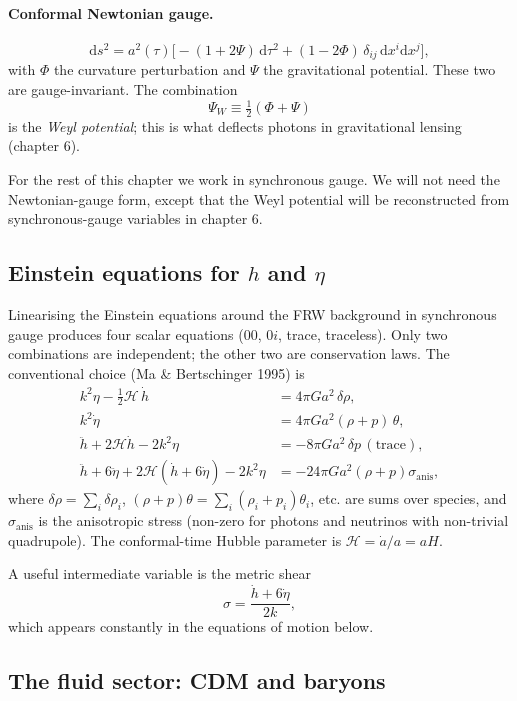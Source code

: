 \paragraph{Conformal Newtonian gauge.}
\[
  \mathrm{d}s^2 = a^2(\tau)\bigl[-(1 + 2\Psi)\,\mathrm{d}\tau^2 + (1 - 2\Phi)\,\delta_{ij}\,\mathrm{d}x^i \mathrm{d}x^j\bigr],
\]
with $\Phi$ the curvature perturbation and $\Psi$ the gravitational potential. These two are gauge-invariant. The combination
\[
  \Psi_W \equiv \tfrac{1}{2}(\Phi + \Psi)
\]
is the \emph{Weyl potential}; this is what deflects photons in gravitational lensing (chapter 6).

For the rest of this chapter we work in synchronous gauge. We will not need the Newtonian-gauge form, except that the Weyl potential will be reconstructed from synchronous-gauge variables in chapter 6.

\subsection{Einstein equations for $h$ and $\eta$}

Linearising the Einstein equations around the FRW background in synchronous gauge produces four scalar equations (00, $0i$, trace, traceless). Only two combinations are independent; the other two are conservation laws. The conventional choice (Ma \& Bertschinger 1995) is
\begin{align}
  k^2 \eta - \tfrac{1}{2}\mathcal{H}\,\dot h &= 4\pi G a^2\, \delta\rho, \label{eq:Einstein00}\\
  k^2 \dot\eta &= 4\pi G a^2 (\rho + p)\,\theta, \label{eq:Einstein0i}\\
  \ddot h + 2 \mathcal{H} \dot h - 2 k^2 \eta &= -8\pi G a^2\, \delta p\,(\text{trace}), \\
  \ddot h + 6 \ddot\eta + 2\mathcal{H}(\dot h + 6 \dot\eta) - 2 k^2 \eta &= -24\pi G a^2 (\rho + p)\sigma_\text{anis},
\end{align}
where $\delta\rho = \sum_i \delta\rho_i$, $(\rho + p)\theta = \sum_i (\rho_i + p_i)\theta_i$, etc. are sums over species, and $\sigma_\text{anis}$ is the anisotropic stress (non-zero for photons and neutrinos with non-trivial quadrupole). The conformal-time Hubble parameter is $\mathcal{H} = \dot a/a = aH$.

A useful intermediate variable is the metric shear
\[
  \sigma = \frac{\dot h + 6 \dot\eta}{2k},
\]
which appears constantly in the equations of motion below.

\subsection{The fluid sector: CDM and baryons}


